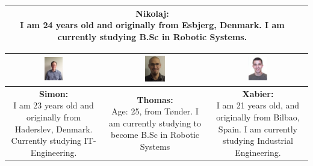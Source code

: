 \begin{table}[h]
\begin{tabular}{|c|c|c|c|}
&

\parbox[t] {0.2\textwidth}{
\textbf{Nikolaj:} \\
I am 24 years old and originally from Esbjerg, Denmark. I am currently studying B.Sc in Robotic Systems.
} 

\\\hline
\end{tabular}

\begin{tabular}{|c|c|c|}
\hline
\includegraphics[width=0.2\textwidth]{graphics/Simon_profile} & %
\includegraphics[width=0.2\textwidth]{graphics/Thomas_profile} & %
\includegraphics[width=0.2\textwidth]{graphics/sexy_xabi_profile} \\ \hline %
\parbox[t] {0.2\textwidth}{
\textbf{Simon:} \\
I am 23 years old and originally from Haderslev, Denmark. Currently studying IT-Engineering.

} 

&

\parbox[t] {0.2\textwidth}{
\textbf{Thomas:} \\
Age: 25, from Tønder. I am currently studying to become B.Sc in Robotic Systems
} 

&

\parbox[t] {0.2\textwidth}{
\textbf{Xabier:} \\
I am 21 years old, and originally from Bilbao, Spain. I am currently studying Industrial Engineering.
} 

\\\hline
\end{tabular}
\end{table}




